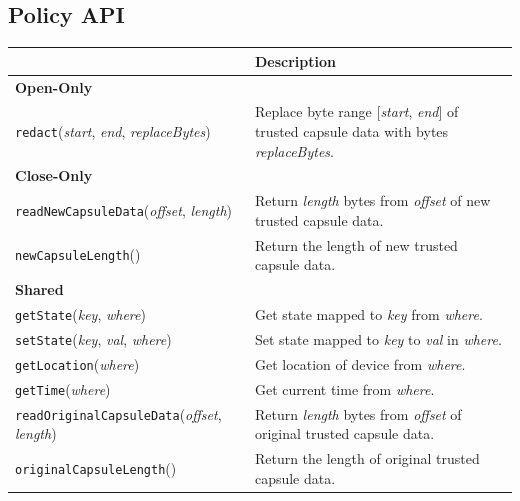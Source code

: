 \subsection{Policy API}
\label{subsec:policy}

\begin{table}[t]
\begin{center}
\small{
\begin{tabular}{l|l}
 \hline
 & \textbf{Description} \\\hline\hline
 \textbf{Open-Only} & \\\hline\hline

  {\tt redact}({\em start}, {\em end}, {\em replaceBytes})
  & Replace byte range [{\em start}, {\em end}] of trusted capsule data with bytes {\em replaceBytes}. \\\hline

 \textbf{Close-Only} & \\\hline\hline

  {\tt readNewCapsuleData}({\em offset}, {\em length})
  & Return {\em length} bytes from {\em offset} of new trusted capsule data. \\\hline

  {\tt newCapsuleLength}()
  & Return the length of new trusted capsule data. \\\hline

 \textbf{Shared} & \\\hline\hline

  {\tt getState}({\em key}, {\em where})
  & Get state mapped to {\em key} from {\em where}. \\\hline

  {\tt setState}({\em key}, {\em val}, {\em where})
  & Set state mapped to {\em key} to {\em val} in {\em where}. \\\hline

  {\tt getLocation}({\em where})
  & Get location of device from {\em where}. \\\hline

  {\tt getTime}({\em where})
  & Get current time from {\em where}. \\\hline

  {\tt readOriginalCapsuleData}({\em offset}, {\em length})
  & Return {\em length} bytes from {\em offset} of original trusted capsule data. \\\hline

  {\tt originalCapsuleLength}()
  & Return the length of original trusted capsule data. \\\hline


\end{tabular}}
\end{center}
\end{table}
